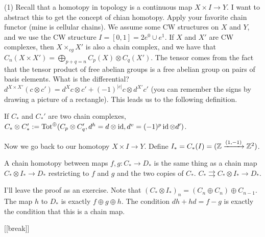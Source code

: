 (1) Recall that a homotopy in topology is a continuous map $X\times I\to Y$. I want to abstract this to get the concept of chian homotopy. Apply your favorite chain functor (mine is cellular chains). We assume some CW structures on $X$ and $Y$, and we use the CW structure $I=[0,1]=2e^0\cup e^1$. If $X$ and $X'$ are CW complexes, then $X\times_{cg} X'$ is also a chain complex, and we have that $C_n(X\times X')=\bigoplus_{p+q=n} C_p(X)\otimes C_q(X')$. The tensor comes from the fact that the tensor product of free abelian groups is a free abelian group on pairs of basis elements. What is the differential? $d^{X\times X'}(c\otimes c')=d^X c\otimes c' +(-1)^{|c|} c\otimes d^{X'}c'$ (you can remember the signs by drawing a picture of a rectangle). This leads us to the following definition.
\begin{definition}
 If $C_*$ and $C_*'$ are two chain complexes, $C_*\otimes C_*':= \operatorname{Tot}^\oplus(C_p\otimes C'_q, d^h=d\otimes \operatorname{id}, d^v=(-1)^p\operatorname{id}\otimes d')$.
\end{definition}
Now we go back to our homotopy $X\times I\to Y$. Define $I_*=C_*(I)=(\mathbb{Z}\xrightarrow{(1,-1)} \mathbb{Z}^2)$.
\begin{lemma}
 A chain homotopy between maps $f,g\colon C_*\to D_*$ is the same thing as a chain map $C_*\otimes I_*\to D_*$ restricting to $f$ and $g$ and the two copies of $C_*$. $C_*\rightrightarrows C_*\otimes I_*\to D_*$.
\end{lemma}
I'll leave the proof as an exercise. Note that $(C_*\otimes I_*)_n = (C_n\oplus C_n)\oplus C_{n-1}$. The map $h$ to $D_*$ is exactly $f\oplus g\oplus h$. The condition $dh+hd=f-g$ is exactly the condition that this is a chain map.

[[break]]

